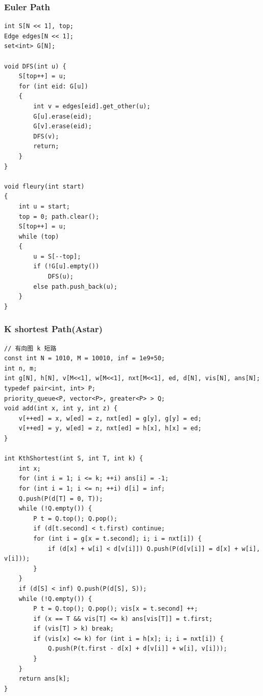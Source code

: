 \documentclass[twoside]{article}
\begin{document}
\subsubsection{Euler Path}
\begin{lstlisting}
int S[N << 1], top;
Edge edges[N << 1];
set<int> G[N];

void DFS(int u) {
    S[top++] = u;
    for (int eid: G[u]) 
    {
        int v = edges[eid].get_other(u);
        G[u].erase(eid);
        G[v].erase(eid);
        DFS(v);
        return;
    }
}

void fleury(int start) 
{
    int u = start;
    top = 0; path.clear();
    S[top++] = u;
    while (top) 
    {
        u = S[--top];
        if (!G[u].empty())
            DFS(u);
        else path.push_back(u);
    }
}\end{lstlisting}
\subsubsection{K shortest Path(Astar)}
\begin{lstlisting}
// 有向图 k 短路
const int N = 1010, M = 10010, inf = 1e9+50;
int n, m;
int g[N], h[N], v[M<<1], w[M<<1], nxt[M<<1], ed, d[N], vis[N], ans[N];
typedef pair<int, int> P;
priority_queue<P, vector<P>, greater<P> > Q;
void add(int x, int y, int z) {
    v[++ed] = x, w[ed] = z, nxt[ed] = g[y], g[y] = ed;
    v[++ed] = y, w[ed] = z, nxt[ed] = h[x], h[x] = ed;
}

int KthShortest(int S, int T, int k) {
    int x;
    for (int i = 1; i <= k; ++i) ans[i] = -1;
    for (int i = 1; i <= n; ++i) d[i] = inf;
    Q.push(P(d[T] = 0, T));
    while (!Q.empty()) {
        P t = Q.top(); Q.pop();
        if (d[t.second] < t.first) continue;
        for (int i = g[x = t.second]; i; i = nxt[i]) {
            if (d[x] + w[i] < d[v[i]]) Q.push(P(d[v[i]] = d[x] + w[i], v[i]));
        }
    }
    if (d[S] < inf) Q.push(P(d[S], S));
    while (!Q.empty()) {
        P t = Q.top(); Q.pop(); vis[x = t.second] ++;
        if (x == T && vis[T] <= k) ans[vis[T]] = t.first;
        if (vis[T] > k) break;
        if (vis[x] <= k) for (int i = h[x]; i; i = nxt[i]) {
            Q.push(P(t.first - d[x] + d[v[i]] + w[i], v[i]));
        }
    }
    return ans[k];
}\end{lstlisting}
\end{document}
